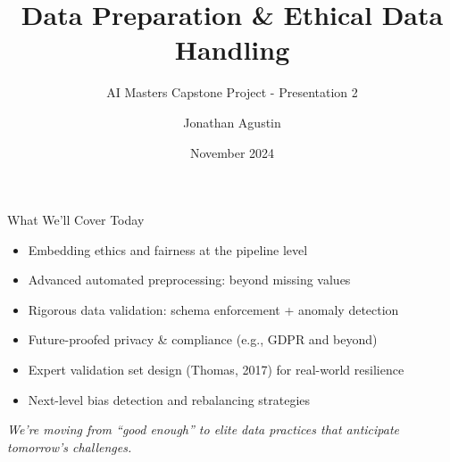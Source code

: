 \documentclass[aspectratio=169]{beamer}
\title{Data Preparation \& Ethical Data Handling}
\subtitle{AI Masters Capstone Project - Presentation 2}
\author{Jonathan Agustin}
\date{November 2024}
\begin{document}
\maketitle

%
\begin{frame}{What We’ll Cover Today}
\begin{itemize}
\item Embedding ethics and fairness at the pipeline level
\item Advanced automated preprocessing: beyond missing values
\item Rigorous data validation: schema enforcement + anomaly detection
\item Future-proofed privacy \& compliance (e.g., GDPR and beyond)
\item Expert validation set design (Thomas, 2017) for real-world resilience
\item Next-level bias detection and rebalancing strategies
\end{itemize}

\vspace{0.8em}
\emph{We’re moving from “good enough” to elite data practices that anticipate tomorrow’s challenges.}
\end{frame}
\end{document}
